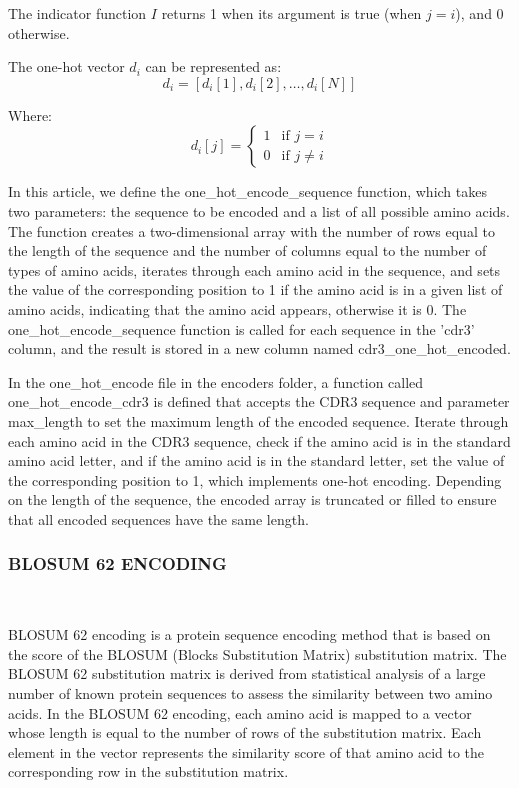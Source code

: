 \documentclass[conference]{IEEEtran}
\begin{document}
	The indicator function \( I \) returns 1 when its argument is true (when \( j = i \)), and 0 otherwise.
	
	The one-hot vector \( d_i \) can be represented as:
	\[ d_i = [d_{i}[1], d_{i}[2], \ldots, d_{i}[N]] \]
	
	Where:
	\[ d_{i}[j] = 
	\begin{cases} 
		1 & \text{if } j = i \\ 
		0 & \text{if } j \neq i 
	\end{cases}
	\]
	
	In this article, we define the one\_hot\_encode\_sequence function, which takes two parameters: the sequence to be encoded and a list of all possible amino acids. The function creates a two-dimensional array with the number of rows equal to the length of the sequence and the number of columns equal to the number of types of amino acids, iterates through each amino acid in the sequence, and sets the value of the corresponding position to 1 if the amino acid is in a given list of amino acids, indicating that the amino acid appears, otherwise it is 0. The one\_hot\_encode\_sequence function is called for each sequence in the 'cdr3' column, and the result is stored in a new column named cdr3\_one\_hot\_encoded.
	
	
	In the one\_hot\_encode file in the encoders folder, a function called one\_hot\_encode\_cdr3 is defined that accepts the CDR3 sequence and parameter max\_length to set the maximum length of the encoded sequence. Iterate through each amino acid in the CDR3 sequence, check if the amino acid is in the standard amino acid letter, and if the amino acid is in the standard letter, set the value of the corresponding position to 1, which implements one-hot encoding. Depending on the length of the sequence, the encoded array is truncated or filled to ensure that all encoded sequences have the same length.
	
	\subsubsection{BLOSUM 62 ENCODING} \
	
	BLOSUM 62\cite{b2} encoding is a protein sequence encoding method that is based on the score of the BLOSUM (Blocks Substitution Matrix) substitution matrix. The BLOSUM 62 substitution matrix is derived from statistical analysis of a large number of known protein sequences to assess the similarity between two amino acids. In the BLOSUM 62 encoding, each amino acid is mapped to a vector whose length is equal to the number of rows of the substitution matrix. Each element in the vector represents the similarity score of that amino acid to the corresponding row in the substitution matrix.
	
\end{document}
